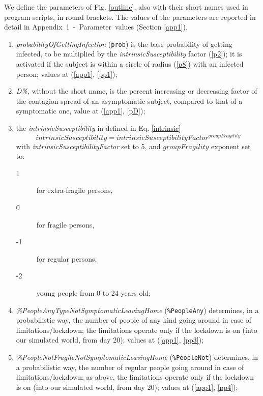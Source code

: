 \documentclass[graybox]{svmult}
\begin{document}
We define the parameters of Fig. \ref{outline}, also with their short names used in program scripts, in round brackets. The values of the parameters are reported in detail in Appendix~1~-~Parameter~values (Section \ref{app1}).

\begin{enumerate}[label=\roman*]

\item \label{p1} \emph{probabilityOfGettingInfection} (\verb|prob|) is the base probability of getting infected, to be multiplied by the \emph{intrinsicSusceptibility} factor (\ref{p2}); it is activated if the subject is within a circle of radius (\ref{p8}) with an infected person; values at (\ref{app1}, \ref{pp1});

\item \label{D} \emph{D\%}, without the short name, is the percent increasing or decreasing factor of the contagion spread of an asymptomatic subject, compared to that of a symptomatic one, value at (\ref{app1}, \ref{pD});

\item \label{p2} the \emph{intrinsicSusceptibility} in defined in Eq. \ref{intrinsic} 
\begin{equation}
intrinsicSusceptibility = intrinsicSusceptibilityFactor^{groupFragility}
\label{intrinsic}
\end{equation}
with \emph{intrinsicSusceptibilityFactor} set to 5, and $groupFragility$ exponent set to:

\begin{description}
\item [1] for extra-fragile persons,
\item [0] for fragile persons,
\item [-1] for regular persons,
\item [-2] young people from 0 to 24 years old;
\end{description}

\item \label{p3} \emph{\%PeopleAnyTypeNotSymptomaticLeavingHome} (\verb|%PeopleAny|)
determines, in a probabilistic way, the number of people of any kind going around in case of limitations/lockdown; the limitations operate only if the lockdown is on (into our simulated world, from day 20); values at (\ref{app1}, \ref{pp3}); 

\item \label{p4} \emph{\%PeopleNotFragileNotSymptomaticLeavingHome} (\verb|%PeopleNot|)
determines, in a probabilistic way, the number of regular people going around in case of limitations/lockdown;
as above, the limitations operate only if the lockdown is on (into our simulated world, from day 20); values at (\ref{app1}, \ref{pp4});


\end{enumerate}
\end{document}

